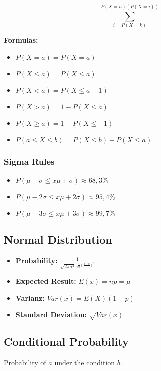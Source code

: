 \[
\sum_{i = P(X=k)}^{P(X=n) (P(X=i))}
\]

\textbf{Formulas: }

\begin{itemize}
    \item \(P(X = a) = P(X = a)\)
    \item \(P(X \le a) = P(X \le a)\)
    \item \(P(X < a) = P(X \le a - 1)\)
    \item \(P(X > a) = 1 - P(X \le a)\)
    \item \(P(X \ge a) = 1 - P(X \le - 1)\)
    \item \(P(a \le X \le b) = P(X \le b) - P(X \le a)\)
\end{itemize}

\subsubsection{Sigma Rules}

\begin{itemize}[label = \(-\)]
    \item \(P(\mu - \sigma \le x \mu + \sigma) \approx 68,3\%\)
    \item \(P(\mu - 2\sigma \le x \mu + 2\sigma) \approx 95,4\%\)
    \item \(P(\mu - 3\sigma \le x \mu + 3\sigma) \approx 99,7\%\)
\end{itemize}

\subsection{Normal Distribution}

\begin{itemize}[label=\(-\)]
    \item \textbf{Probability: } \(\frac{1}{\sqrt{2\pi \sigma^2} e^{\frac{1}{2} \left(\frac{x - u}{\sigma}\right)^2}}\)
    \item \textbf{Expected Result: } \(E(x) = np = \mu\)
    \item \textbf{Varianz: } \(Var(x) = E(X) (1-p)\)
    \item \textbf{Standard Deviation: } \(\sqrt{Var(x)}\)
\end{itemize}

\subsection{Conditional Probability}

Probability of \(a\) under the condition \(b\).

